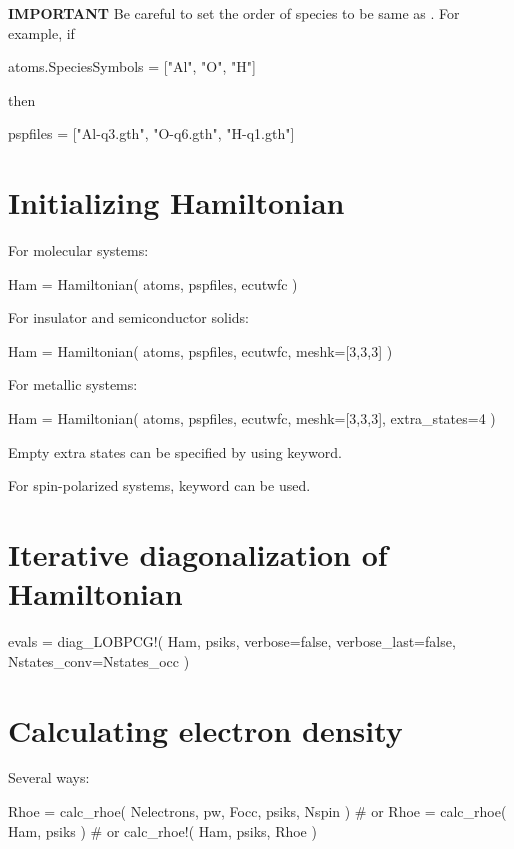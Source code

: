 \textbf{IMPORTANT} Be careful to set the order of species to be same as
. For example, if
\begin{juliacode}
atoms.SpeciesSymbols = ["Al", "O", "H"]
\end{juliacode}
then
\begin{juliacode}
pspfiles = ["Al-q3.gth", "O-q6.gth", "H-q1.gth"]
\end{juliacode}

\section{Initializing Hamiltonian}

For molecular systems:
\begin{juliacode}
Ham = Hamiltonian( atoms, pspfiles, ecutwfc )
\end{juliacode}

For insulator and semiconductor solids:
\begin{juliacode}
Ham = Hamiltonian( atoms, pspfiles, ecutwfc, meshk=[3,3,3] )
\end{juliacode}

For metallic systems:
\begin{juliacode}
Ham = Hamiltonian( atoms, pspfiles, ecutwfc, meshk=[3,3,3], extra_states=4 )
\end{juliacode}

Empty extra states can be specified by using  keyword.

For spin-polarized systems,  keyword can be used.


\section{Iterative diagonalization of Hamiltonian}

\begin{juliacode}
evals =  diag_LOBPCG!( Ham, psiks, verbose=false, verbose_last=false,
                       Nstates_conv=Nstates_occ )
\end{juliacode}


\section{Calculating electron density}

Several ways:
\begin{juliacode}
Rhoe = calc_rhoe( Nelectrons, pw, Focc, psiks, Nspin )
# or
Rhoe = calc_rhoe( Ham, psiks )
# or
calc_rhoe!( Ham, psiks, Rhoe )
\end{juliacode}

